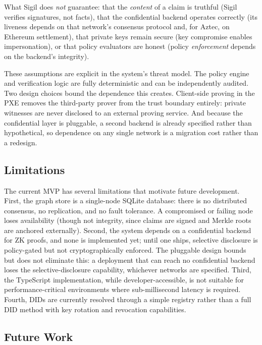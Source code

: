 \documentclass[conference]{IEEEtran}
\begin{document}
What Sigil does \emph{not} guarantee: that the \emph{content} of a claim is
truthful (Sigil verifies signatures, not facts), that the confidential backend
operates correctly (its liveness depends on that network's consensus protocol
and, for Aztec, on Ethereum settlement), that
private keys remain secure (key compromise enables impersonation), or that
policy evaluators are honest (policy \emph{enforcement} depends on the
backend's integrity).

These assumptions are explicit in the system's threat model.  The policy
engine and verification logic are fully deterministic and can be independently
audited.  Two design choices bound the dependence this creates.  Client-side
proving in the PXE removes the third-party prover from the trust boundary
entirely: private witnesses are never disclosed to an external proving service.
And because the confidential layer is pluggable, a second backend is already
specified rather than hypothetical, so dependence on any single network is a
migration cost rather than a redesign.

\subsection{Limitations}

The current MVP has several limitations that motivate future development.
First, the graph store is a single-node SQLite database: there is no
distributed consensus, no replication, and no fault tolerance.  A compromised
or failing node loses availability (though not integrity, since claims are
signed and Merkle roots are anchored externally).  Second, the system depends
on a confidential backend for ZK proofs, and none is implemented yet; until one
ships, selective disclosure is policy-gated but not cryptographically enforced.
The pluggable design bounds but does not eliminate this: a deployment that can
reach no confidential backend loses the selective-disclosure capability,
whichever networks are specified.  Third, the TypeScript implementation,
while developer-accessible, is not suitable for performance-critical
environments where sub-millisecond latency is required.  Fourth, DIDs are
currently resolved through a simple registry rather than a full DID method
with key rotation and revocation capabilities.

\subsection{Future Work}
\end{document}
